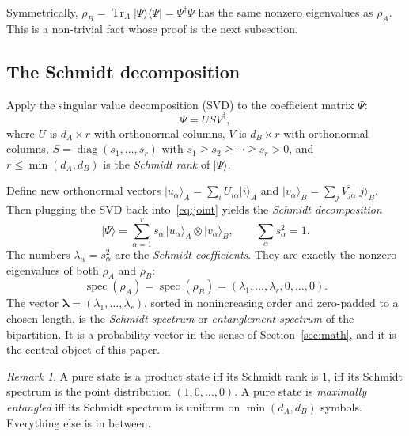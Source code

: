 \documentclass[11pt,a4paper]{article}
\theoremstyle{definition}
\theoremstyle{plain}
\theoremstyle{remark}
\newtheorem*{remark}{Remark}
\newcommand{\ket}[1]{\lvert #1 \rangle}
\newcommand{\bra}[1]{\langle #1 \rvert}
\newcommand{\Tr}{\operatorname{Tr}}
\newcommand{\diag}{\operatorname{diag}}
\DeclareMathOperator{\spec}{spec}
\begin{document}
Symmetrically, $\rho_B = \Tr_A \ket{\Psi}\bra{\Psi} = \Psi^\dagger \Psi$
has the same nonzero eigenvalues as $\rho_A$.  This is a non-trivial
fact whose proof is the next subsection.

\subsection{The Schmidt decomposition}

Apply the singular value decomposition (SVD) to the coefficient matrix
$\Psi$:
\begin{equation}\label{eq:svd}
  \Psi = U S V^\dagger,
\end{equation}
where $U$ is $d_A \times r$ with orthonormal columns, $V$ is
$d_B \times r$ with orthonormal columns, $S = \diag(s_1, \ldots, s_r)$
with $s_1 \ge s_2 \ge \cdots \ge s_r > 0$, and
$r \le \min(d_A, d_B)$ is the \emph{Schmidt rank} of $\ket{\Psi}$.

Define new orthonormal vectors
$\ket{u_\alpha}_A = \sum_i U_{i\alpha} \ket{i}_A$ and
$\ket{v_\alpha}_B = \sum_j \overline{V_{j\alpha}} \ket{j}_B$.  Then
plugging the SVD back into~\eqref{eq:joint} yields the
\emph{Schmidt decomposition}
\begin{equation}\label{eq:schmidt}
  \ket{\Psi} = \sum_{\alpha=1}^{r} s_\alpha \, \ket{u_\alpha}_A \otimes \ket{v_\alpha}_B,
  \qquad \sum_\alpha s_\alpha^2 = 1.
\end{equation}
The numbers $\lambda_\alpha = s_\alpha^2$ are the
\emph{Schmidt coefficients}.  They are exactly the nonzero eigenvalues
of both $\rho_A$ and $\rho_B$:
\begin{equation}\label{eq:rhospec}
  \spec(\rho_A) = \spec(\rho_B) = (\lambda_1, \ldots, \lambda_r, 0, \ldots, 0).
\end{equation}
The vector $\bm{\lambda} = (\lambda_1, \ldots, \lambda_r)$, sorted in
nonincreasing order and zero-padded to a chosen length, is the
\emph{Schmidt spectrum} or \emph{entanglement spectrum} of the
bipartition.  It is a probability vector in the sense of
Section~\ref{sec:math}, and it is the central object of this paper.

\begin{remark}
A pure state is a product state iff its Schmidt rank is $1$, iff its
Schmidt spectrum is the point distribution $(1, 0, \ldots, 0)$.  A
pure state is \emph{maximally entangled} iff its Schmidt spectrum is
uniform on $\min(d_A, d_B)$ symbols.  Everything else is in between.
\end{remark}
\end{document}
